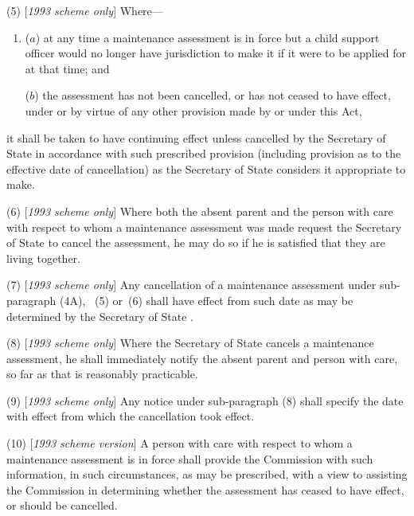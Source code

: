 \documentclass[12pt,a4paper]{article}
\begin{document}
(5) [\emph{1993 scheme only}] Where—
\begin{enumerate}\item[]
($a$) at any time a maintenance assessment is in force but a child support officer would no longer have jurisdiction to make it if it were to be applied for at that time; and

($b$) the assessment has not been cancelled, or has not ceased to have effect, under or by virtue of any other provision made by or under this Act,
\end{enumerate}
it shall be taken to have continuing effect unless cancelled by 
the Secretary of State  %
in accordance with such prescribed provision (including provision as to the effective date of cancellation) as the Secretary of State considers it appropriate to make.

(6) [\emph{1993 scheme only}] Where both the absent parent and the person with care with respect to whom a maintenance assessment was made request 
the Secretary of State  %
to cancel the assessment, he may do so if he is satisfied that they are living together.

(7) [\emph{1993 scheme only}] Any cancellation of a maintenance assessment under sub-paragraph 
(4A),~%
(5)  or~(6)  shall have effect from such date as may be determined by 
the Secretary of State%
.

(8) [\emph{1993 scheme only}] Where 
the Secretary of State  %
cancels a maintenance assessment, he shall immediately notify the absent parent and person with care, so far as that is reasonably practicable.

(9) [\emph{1993 scheme only}] Any notice under sub-paragraph (8)  shall specify the date with effect from which the cancellation took effect.

(10) [\emph{1993 scheme version}] A person with care with respect to whom a maintenance assessment is in force shall provide the 
Commission  %
with such information, in such circumstances, as may be prescribed, with a view to assisting the 
Commission  %
in determining whether the assessment has ceased to have effect, or should be cancelled.
\end{document}
